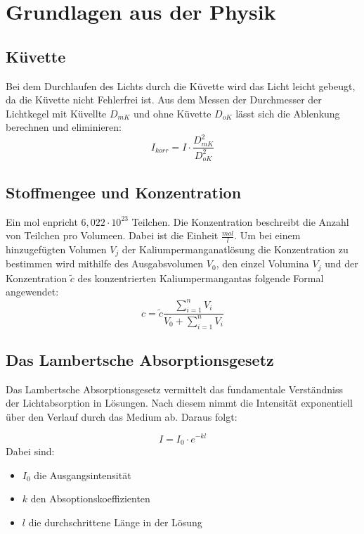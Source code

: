 \section{Grundlagen aus der Physik}

\subsection{Küvette}
Bei dem Durchlaufen des Lichts durch die Küvette wird das Licht leicht gebeugt, da die Küvette nicht Fehlerfrei ist.
Aus dem Messen der Durchmesser der Lichtkegel mit Küvellte $D_{mK}$ und ohne Küvette $D_{oK}$ lässt sich die Ablenkung berechnen und eliminieren:
\begin{equation}
    I_{korr} = I \cdot \frac{D_{mK}^2}{D_{oK}^2}
    \label{eq:Ikorr}
\end{equation}

\subsection{Stoffmengee und Konzentration}
Ein mol enpricht $6,022 \cdot 10^{23}$ Teilchen. Die Konzentration beschreibt die Anzahl von
Teilchen pro Volumeen. Dabei ist die Einheit $\tfrac{mol}{l}$.
Um bei einem hinzugefügten Volumen $V_j$ der Kaliumpermanganatlösung die Konzentration
zu bestimmen wird mithilfe des Ausgabsvolumen $V_0$, den einzel Volumina $V_j$ und der 
Konzentration $\tilde{c}$ des konzentrierten Kaliumpermangantas folgende Formal angewendet:
\begin{equation}
    c = \tilde{c} \frac{\sum_{i=1}^n V_i}{V_0 + \sum_{i=1}^n V_i}
    \label{eq:Konzentration}
\end{equation}

\subsection{Das Lambertsche Absorptionsgesetz}
Das Lambertsche Absorptionsgesetz vermittelt das fundamentale Verständniss der Lichtabsorption
in Lösungen. Nach diesem nimmt die Intensität exponentiell über den Verlauf durch das Medium ab.
Daraus folgt:

\begin{equation}
    I = I_0 \cdot e^{-kl}
\end{equation}
Dabei sind:
\begin{itemize}
    \item $I_0$ die Ausgangsintensität
    \item $k$ den Absoptionskoeffizienten
    \item $l$ die durchschrittene Länge in der Lösung
\end{itemize}


